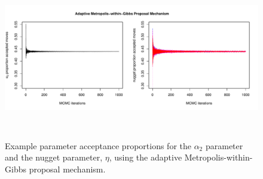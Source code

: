 \documentclass[12pt]{article}
\begin{document}
\begin{figure}
	\centering
		{\includegraphics[width=6in,height=2.5in]{figs/sims/example_acceptance_rates.pdf}}
	\caption{Example parameter acceptance proportions for the $\alpha_2$ parameter and the nugget parameter, $\eta$, using the adaptive Metropolis-within-Gibbs proposal mechanism.}\label{sfig:example_acceptance_rates}
\end{figure}

\clearpage
\end{document}

